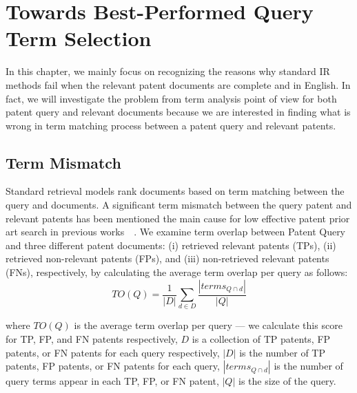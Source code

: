\chapter{Towards Best-Performed Query Term Selection}
\label{cha:analysis}
In this chapter, we mainly focus on recognizing the reasons why standard IR methods fail when the relevant patent documents are complete and in English. In fact, we will investigate the problem from term analysis point of view for both patent query and relevant documents because we are interested in finding what is wrong in term matching process between a patent query and relevant patents. 


\section{Term Mismatch}
\label{sec:termmismatch}
%
Standard retrieval models rank documents based on term matching between the query and documents.  
A significant term mismatch between the query patent and relevant patents has been mentioned the
main cause for low effective patent prior art search in previous works~\citep{roda2010clef}~\citep{magdy2012toward}. 
We examine term overlap between Patent Query and three different patent documents: (i) retrieved relevant patents (TPs), (ii) retrieved non-relevant patents (FPs), and (iii) non-retrieved relevant patents (FNs), respectively, by calculating the average term overlap per query as follows:
\begin{equation} 
TO (Q) = \frac{1}{|D|}\sum_{d\in D}\frac{|terms_{Q\cap d}|}{|Q|}
\label{eq:fntermoverlap}
\end{equation}

where $TO(Q)$ is the average term overlap per query --- we calculate this score for TP, FP, and FN patents respectively, $D$ is a collection of TP patents, FP patents, or FN patents for each query respectively, $|D|$ is the number of TP patents, FP patents, or FN patents for each query, $ |terms_{Q\cap d}| $ is the number of query terms appear in each TP, FP, or FN patent, $ |Q| $ is the size of the query.

